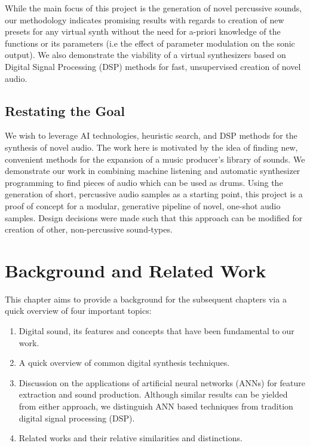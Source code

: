 \documentclass[runningheads,a4paper]{llncs}
\begin{document}
While the main focus of this project is the generation of novel percussive sounds, our methodology indicates promising results with regards to creation of new presets for any virtual synth without the need for a-priori knowledge of the functions or its parameters (i.e the effect of parameter modulation on the sonic output). We also demonstrate the viability of a virtual synthesizers based on Digital Signal Processing (DSP) methods for fast, unsupervised creation of novel audio. 




\section{Restating the Goal}
We wish to leverage AI technologies, heuristic search, and DSP methods for the synthesis of novel audio. The work here is motivated by the idea of finding new, convenient methods for the expansion of a music producer's library of sounds. We demonstrate our work in combining machine listening and automatic synthesizer programming to find pieces of audio which can be used as drums. Using the generation of short, percussive audio samples as a starting point, this project is a proof of concept for a modular, generative pipeline of novel, one-shot audio samples. Design decisions were made such that this approach can be modified for creation of other, non-percussive sound-types. 



\chapter{Background and Related Work}
\label{section:background}
This chapter aims to provide a background for the subsequent chapters via a quick overview of four important topics:\\ 
\begin{enumerate}[label=(\roman*)]
\item Digital sound, its features and concepts that have been fundamental to our work.
\item A quick overview of common digital synthesis techniques.
\item Discussion on the applications of artificial neural networks (ANNs) for feature extraction and sound production. Although similar results can be yielded from either approach, we distinguish ANN based techniques from tradition digital signal processing (DSP).
\item Related works and their relative similarities and distinctions.
\end{enumerate}
\end{document}
